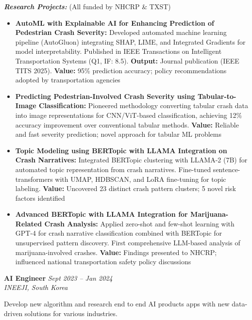 \documentclass[10pt,a4paper]{article}
\newcommand{\experience}[4]{%
    \noindent\textbf{#1} \hfill \textit{#2}\\
    \textit{#3} \hfill #4\vspace{2pt}
}
\begin{document}
\textit{\textbf{Research Projects:}} (All funded by NHCRP \& TXST)
\begin{itemize}
    \item \textbf{AutoML with Explainable AI for Enhancing Prediction of Pedestrian Crash Severity:} Developed automated machine learning pipeline (AutoGluon) integrating SHAP, LIME, and Integrated Gradients for model interpretability. Published in IEEE Transactions on Intelligent Transportation Systems (Q1, IF: 8.5). \textcolor{accent}{\textbf{Output:}} Journal publication (IEEE TITS 2025). \textcolor{accent}{\textbf{Value:}} 95\% prediction accuracy; policy recommendations adopted by transportation agencies
    \item \textbf{Predicting Pedestrian-Involved Crash Severity using Tabular-to-Image Classification:} Pioneered methodology converting tabular crash data into image representations for CNN/ViT-based classification, achieving 12\% accuracy improvement over conventional tabular methods. \textcolor{accent}{\textbf{Value:}} Reliable and fast severity prediction; novel approach for tabular ML problems
    \item \textbf{Topic Modeling using BERTopic with LLAMA Integration on Crash Narratives:} Integrated BERTopic clustering with LLAMA-2 (7B) for automated topic representation from crash narratives. Fine-tuned sentence-transformers with UMAP, HDBSCAN, and LoRA fine-tuning for topic labeling. \textcolor{accent}{\textbf{Value:}} Uncovered 23 distinct crash pattern clusters; 5 novel risk factors identified
    \item \textbf{Advanced BERTopic with LLAMA Integration for Marijuana-Related Crash Analysis:} Applied zero-shot and few-shot learning with GPT-4 for crash narrative classification combined with BERTopic for unsupervised pattern discovery. First comprehensive LLM-based analysis of marijuana-involved crashes. \textcolor{accent}{\textbf{Value:}} Findings presented to NHCRP; influenced national transportation safety policy discussions
\end{itemize}

\vspace{4pt}

\experience{AI Engineer}{Sept 2023 -- Jan 2024}{INEEJI, South Korea}{}

Develop new algorithm and research end to end AI products apps with new data-driven solutions for various industries.
\end{document}

